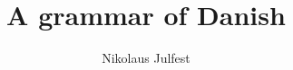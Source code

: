 \title{A grammar of Danish}  %
\subtitle{}
\BackBody{}
\author{Nikolaus Julfest}
\renewcommand{\lsISBNdigital}{000-0-000000-00-0}
\renewcommand{\lsISBNhardcover}{000-0-000000-00-0}
\renewcommand{\lsISBNsoftcover}{000-0-000000-00-0}
\renewcommand{\lsSeries}{sidl} %
\renewcommand{\lsSeriesNumber}{23} %
 
